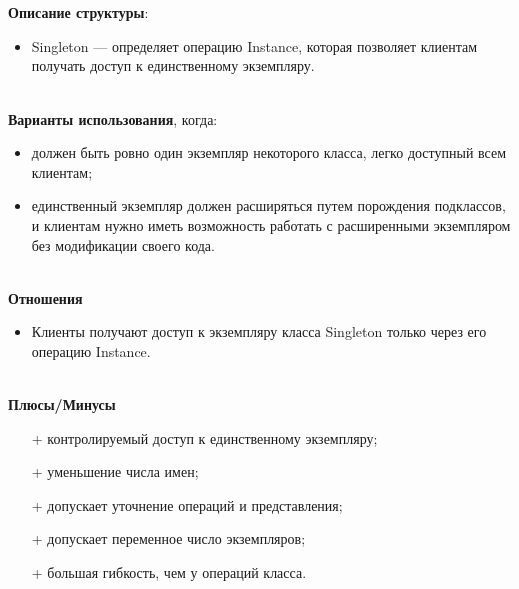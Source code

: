 \documentclass[a3paper,11pt]{report}
\def \boxSize {7cm}
\newcommand{\umlnoteND}[6]{
	\node[umlcd style, anchor=north, draw, shape=umlcdnote, text width=#2] at (#1) (note) {#3};
	\draw [umlcd style dashed line , ] (note.#4) ++(#5) --++(#6) coordinate(tmp) node[circle,inner sep=0pt,draw, fill=black!1, minimum size=5pt] (NoD) { };
}
\begin{document}
\\\\
\textbf{Описание структуры}:
\begin{itemize}
\item Singleton --- определяет операцию Instance, которая позволяет клиентам получать доступ к единственному экземпляру.
\end{itemize}

\large\textbf{\\Варианты использования}, когда:
\begin{itemize}
\item должен быть ровно один экземпляр некоторого класса, легко доступный всем клиентам;
\item единственный экземпляр должен расширяться путем порождения подклассов, и клиентам нужно иметь возможность работать с расширенными экземпляром без модификации своего кода.
\end{itemize}

\textbf{\\Отношения}
\begin{itemize}
\item Клиенты получают доступ к экземпляру класса Singleton только через его операцию Instance.
\end{itemize}

\textbf{\\Плюсы/Минусы}
\begin{itemize}
\item [+] контролируемый доступ к единственному экземпляру;
\item [+] уменьшение числа имен;
\item [+] допускает уточнение операций и представления;
\item [+] допускает переменное число экземпляров;
\item [+] большая гибкость, чем у операций класса.
\end{itemize}

\newpage
\end{document}
